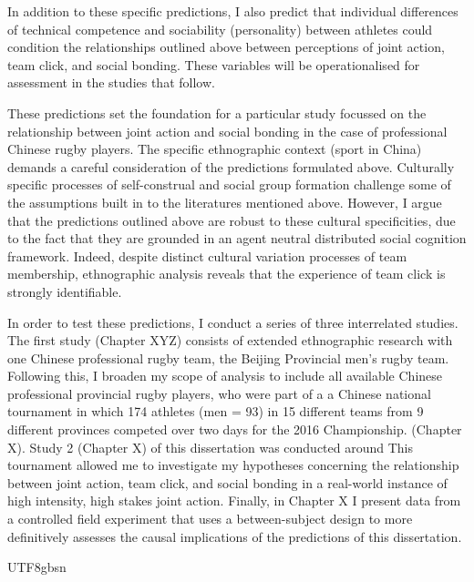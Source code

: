 \begin{CJK}{UTF8}{gbsn}
\begin{indent}
\begin{description}
  \end{description}
  \end{indent}

 In addition to these specific predictions, I also predict that individual differences of technical competence and sociability (personality) between athletes could condition the relationships outlined above between perceptions of joint action, team click, and social bonding.  These variables will be operationalised for assessment in the studies that follow.


These predictions set the foundation for a particular study focussed on the relationship between joint action and social bonding in the case of professional Chinese rugby players. The specific ethnographic context (sport in China) demands a careful consideration of the predictions formulated above.  Culturally specific processes of self-construal and social group formation challenge some of the assumptions built in to the literatures mentioned above.  However, I argue that the predictions outlined above are robust to these cultural specificities, due to the fact that they are grounded in an agent neutral distributed social cognition framework. Indeed, despite distinct cultural variation processes of team membership, ethnographic analysis reveals that the experience of team click is strongly identifiable.

In order to test these predictions, I conduct a series of three interrelated studies.  The first study (Chapter XYZ) consists of extended ethnographic research with one Chinese professional rugby team, the Beijing Provincial men's rugby team.  Following this, I broaden my scope of analysis to include all available Chinese professional provincial rugby players, who were part of a a Chinese national tournament in which 174 athletes (men = 93) in 15 different teams from 9 different provinces competed over two days for the 2016 Championship. (Chapter X).  Study 2  (Chapter X) of this dissertation was conducted around This tournament allowed me to investigate my hypotheses concerning the relationship between joint action, team click, and social bonding in a real-world instance of high intensity, high stakes joint action.  Finally, in Chapter X I present data from a controlled field experiment that uses a between-subject design to more definitively assesses the causal implications of the predictions of this dissertation.

\end{CJK}{UTF8}{gbsn}

